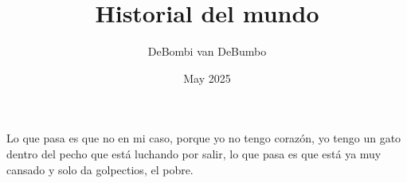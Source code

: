 \documentclass[11pt]{article}
\title{Historial del mundo}
\author{DeBombi van DeBumbo}
\date{May 2025}
\begin{document}
\maketitle

Lo que pasa es que no en mi caso, porque yo no tengo corazón, yo tengo un gato dentro del pecho que está luchando por salir, lo que pasa es que está ya muy cansado y solo da golpectios, el pobre.
\end{document}
